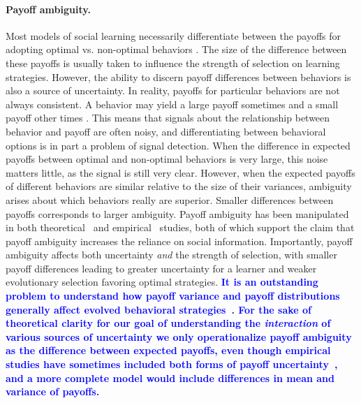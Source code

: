 \documentclass[letterpaper,11.5pt]{scrartcl}
\newcommand{\edit}[1]{{\bfseries \textcolor{blue} {#1}}}
\begin{document}
\paragraph{Payoff ambiguity.} Most models of social learning necessarily differentiate between the payoffs for adopting optimal vs. non-optimal behaviors
\citep{BoydRicherson1985,Rogers1988,Enquist2007,Rendell2010,aoki2014evolution}. The size of the difference between these payoffs is usually taken to influence the strength of selection on learning strategies.
However, the ability to discern payoff differences between behaviors is also a source of uncertainty. In reality, payoffs for particular behaviors are not always consistent. A behavior may yield a large payoff sometimes and a small
payoff other times \citep{McElreath2005}. This means that signals about the
relationship between behavior and payoff are often noisy, and differentiating
between behavioral options is in part a problem of signal detection. When the
difference in expected payoffs between optimal and non-optimal behaviors is very
large, this noise matters little, as the signal is still very clear. However, when
the expected payoffs of different behaviors are similar relative to the size of
their variances, ambiguity arises about which behaviors really are superior.
Smaller differences between payoffs corresponds to larger ambiguity. Payoff
ambiguity has been manipulated in both theoretical~\citep{perreault2012bayesian}
and empirical~\citep{McElreath2005,Toyokawa2019} studies, both of which support the
claim that payoff ambiguity increases the reliance on social information.
Importantly, payoff ambiguity %
affects both uncertainty \emph{and} the strength of selection, with smaller payoff differences leading to greater uncertainty for a learner and weaker evolutionary selection favoring optimal strategies. 
\edit{It is an outstanding problem to understand how payoff variance and payoff
distributions generally affect evolved behavioral strategies~\citep{Haaland2019}.
For the sake of theoretical clarity for our goal of understanding the
\emph{interaction} of various sources of uncertainty we only operationalize payoff
ambiguity as the difference between expected payoffs, even though empirical studies
have sometimes included both forms of payoff uncertainty~\citep{McElreath2005,Toyokawa2019}, and a more complete model would include differences in mean and variance of payoffs.}

\end{document}
